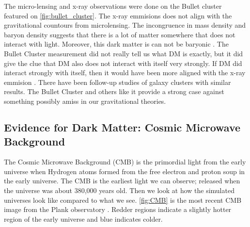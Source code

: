 The micro-lensing and x-ray observations were done on the Bullet cluster featured on \cref{fig:bullet_cluster}.
The x-ray emmisions does not align with the gravitational countours from microlensing.
The incongruence in mass density and baryon density suggests that there is a lot of matter somewhere that does not interact with light.
Moreover, this dark matter is can not be baryonic \cite{Clowe:BulletCluster}.
The Bullet Cluster measurement did not really tell us what DM is exactly, but it did give the clue that DM also does not interact with itself very strongly.
If DM did interact strongly with itself, then it would have been more aligned with the x-ray emmision \cite{Clowe:BulletCluster}.
There have been follow-up studies of galaxy clusters with similar results.
The Bullet Cluster and others like it provide a strong case against something possibly amiss in our gravitational theories.

\subsection{Evidence for Dark Matter: Cosmic Microwave Background\label{sec:ev4dm_cmb}}

\begin{figure}[ht]
\end{figure}

The Cosmic Microwave Background (CMB) is the primordial light from the early universe when Hydrogen atoms formed from the free electron and proton soup in the early universe.
The CMB is the earliest light we can observe; released when the universe was about 380,000 years old.
Then we look at how the simulated universes look like compared to what we see.
\cref{fig:CMB} is the most recent CMB image from the Plank observatory \cite{Plank:CMB}.
Redder regions indicate a slightly hotter region of the early universe and blue indicates colder.

